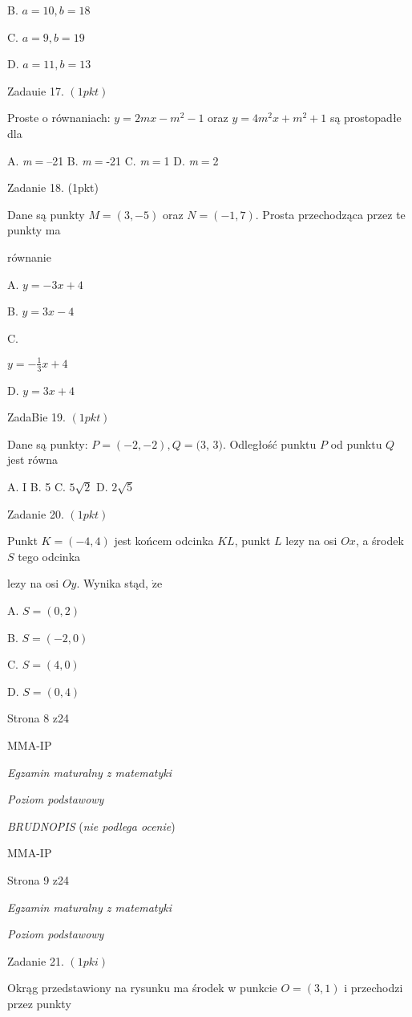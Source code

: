 \documentclass[a4paper,12pt]{article}
\begin{document}
B. $a=10, b=18$

C. $a=9, b=19$

D. $a=11, b=13$

Zadauie 17. $(1pkt)$

Proste o równaniach: $y=2mx-m^{2}-1$ oraz $y=4m^{2}x+m^{2}+1$ są prostopadłe dla

A. {\it m}$=$--21 B. {\it m}$=$-21 C. {\it m}$=$1 D. {\it m}$=$2

Zadanie 18. (1pkt)

Dane są punkty $M=(3,-5)$ oraz $N=(-1,7)$. Prosta przechodząca przez te punkty ma

równanie

A. $y=-3x+4$

B. $y=3x-4$

C.

$y=-\displaystyle \frac{1}{3}x+4$

D. $y=3x+4$

ZadaBie 19. $(1pkt)$

Dane są punkty: $P=(-2,-2), Q=(3$, 3$)$. Odległość punktu $P$ od punktu $Q$ jest równa

A. I B. 5 C. $5\sqrt{2}$ D. $2\sqrt{5}$

Zadanie 20. $(1pkt)$

Punkt $K=(-4,4)$ jest końcem odcinka $KL$, punkt $L$ lezy na osi $Ox$, a środek $S$ tego odcinka

lezy na osi $Oy$. Wynika stąd, $\dot{\mathrm{z}}\mathrm{e}$

A. $S=(0,2)$

B. $S=(-2,0)$

C. $S=(4,0)$

D. $S=(0,4)$

Strona 8 z24

MMA-IP





{\it Egzamin maturalny z matematyki}

{\it Poziom podstawowy}

{\it BRUDNOPIS} ({\it nie podlega ocenie})

MMA-IP

Strona 9 z24





{\it Egzamin maturalny z matematyki}

{\it Poziom podstawowy}

Zadanie 21. $(1pki)$

Okrąg przedstawiony na rysunku ma środek w punkcie $O=(3,1)$ i przechodzi przez punkty
\end{document}
